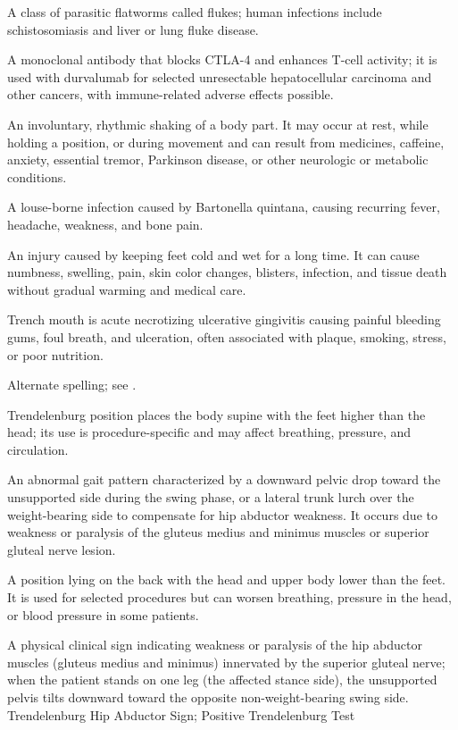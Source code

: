  A class of parasitic flatworms called flukes; human infections include schistosomiasis and liver or lung fluke disease.

 A monoclonal antibody that blocks CTLA-4 and enhances T-cell activity; it is used with durvalumab for selected unresectable hepatocellular carcinoma and other cancers, with immune-related adverse effects possible.

 An involuntary, rhythmic shaking of a body part. It may occur at rest, while holding a position, or during movement and can result from medicines, caffeine, anxiety, essential tremor, Parkinson disease, or other neurologic or metabolic conditions.

 A louse-borne infection caused by Bartonella quintana, causing recurring fever, headache, weakness, and bone pain.

 An injury caused by keeping feet cold and wet for a long time. It can cause numbness, swelling, pain, skin color changes, blisters, infection, and tissue death without gradual warming and medical care.

 Trench mouth is acute necrotizing ulcerative gingivitis causing painful bleeding gums, foul breath, and ulceration, often associated with plaque, smoking, stress, or poor nutrition.

 Alternate spelling; see .

 Trendelenburg position places the body supine with the feet higher than the head; its use is procedure-specific and may affect breathing, pressure, and circulation.

 An abnormal gait pattern characterized by a downward pelvic drop toward the unsupported side during the swing phase, or a lateral trunk lurch over the weight-bearing side to compensate for hip abductor weakness. It occurs due to weakness or paralysis of the gluteus medius and minimus muscles or superior gluteal nerve lesion.

 A position lying on the back with the head and upper body lower than the feet. It is used for selected procedures but can worsen breathing, pressure in the head, or blood pressure in some patients.

 A physical clinical sign indicating weakness or paralysis of the hip abductor muscles (gluteus medius and minimus) innervated by the superior gluteal nerve; when the patient stands on one leg (the affected stance side), the unsupported pelvis tilts downward toward the opposite non-weight-bearing swing side.
\synonyms
Trendelenburg Hip Abductor Sign; Positive Trendelenburg Test


